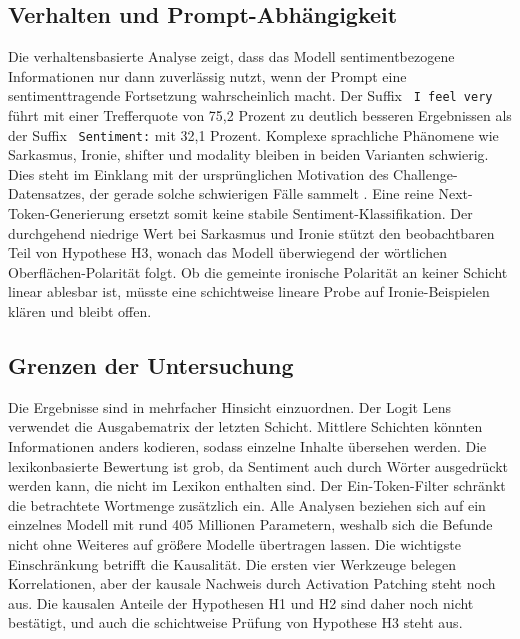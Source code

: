 \subsection{Verhalten und Prompt-Abhängigkeit}

Die verhaltensbasierte Analyse zeigt, dass das Modell sentimentbezogene Informationen nur dann zuverlässig nutzt, wenn der Prompt eine sentimenttragende Fortsetzung wahrscheinlich macht. Der Suffix \texttt{ I feel very} führt mit einer Trefferquote von 75,2 Prozent zu deutlich besseren Ergebnissen als der Suffix \texttt{ Sentiment:} mit 32,1 Prozent. Komplexe sprachliche Phänomene wie Sarkasmus, Ironie, shifter und modality bleiben in beiden Varianten schwierig. Dies steht im Einklang mit der ursprünglichen Motivation des Challenge-Datensatzes, der gerade solche schwierigen Fälle sammelt \cite{barnes2019sentiment}. Eine reine Next-Token-Generierung ersetzt somit keine stabile Sentiment-Klassifikation. Der durchgehend niedrige Wert bei Sarkasmus und Ironie stützt den beobachtbaren Teil von Hypothese H3, wonach das Modell überwiegend der wörtlichen Oberflächen-Polarität folgt. Ob die gemeinte ironische Polarität an keiner Schicht linear ablesbar ist, müsste eine schichtweise lineare Probe auf Ironie-Beispielen klären und bleibt offen.

\subsection{Grenzen der Untersuchung}

Die Ergebnisse sind in mehrfacher Hinsicht einzuordnen. Der Logit Lens verwendet die Ausgabematrix der letzten Schicht. Mittlere Schichten könnten Informationen anders kodieren, sodass einzelne Inhalte übersehen werden. Die lexikonbasierte Bewertung ist grob, da Sentiment auch durch Wörter ausgedrückt werden kann, die nicht im Lexikon enthalten sind. Der Ein-Token-Filter schränkt die betrachtete Wortmenge zusätzlich ein. Alle Analysen beziehen sich auf ein einzelnes Modell mit rund 405 Millionen Parametern, weshalb sich die Befunde nicht ohne Weiteres auf größere Modelle übertragen lassen. Die wichtigste Einschränkung betrifft die Kausalität. Die ersten vier Werkzeuge belegen Korrelationen, aber der kausale Nachweis durch Activation Patching steht noch aus. Die kausalen Anteile der Hypothesen H1 und H2 sind daher noch nicht bestätigt, und auch die schichtweise Prüfung von Hypothese H3 steht aus.
